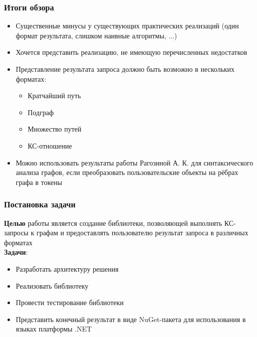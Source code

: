 \documentclass{beamer}
\begin{document}
\begin{frame}
  \transwipe[direction=90]
  \frametitle{Итоги обзора}
  \begin{itemize}
    \item Существенные минусы у существующих практических реализаций (один формат результата, слишком наивные алгоритмы, ...)
    \item Хочется представить реализацию, не имеющую перечисленных недостатков
    \item Представление результата запроса должно быть возможно в нескольких форматах:
    \begin{itemize}
        \item Кратчайший путь
        \item Подграф
        \item Множество путей
        \item КС-отношение
    \end{itemize}
    \item Можно использовать результаты работы Рагозиной А. К. для синтаксического анализа графов, если преобразовать пользовательские объекты на рёбрах графа в токены
  \end{itemize}
\end{frame}

\begin{frame}
  \transwipe[direction=90]
  \frametitle{Постановка задачи}
  \textbf{Целью} работы является создание библиотеки, позволяющей выполнять КС-запросы к графам и предоставлять пользователю результат запроса в различных форматах\\ 
  \textbf{Задачи}:
  \begin{itemize}
    \item Разработать архитектуру решения
    \item Реализовать библиотеку
    \item Провести тестирование библиотеки
    \item Представить конечный результат в виде NuGet-пакета для использования в языках платформы .NET
  \end{itemize}
\end{frame}
\end{document}
